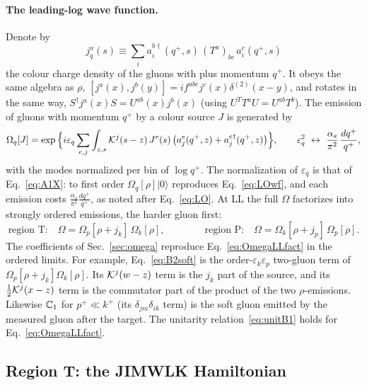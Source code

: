 \paragraph*{The leading-log wave function.} Denote by
\begin{equation}
j^a_q(s)\equiv\sum_i a^{b\dagger}_i(q^+,s)\,(T^a)_{bc}\,a^c_i(q^+,s)
\label{eq:jdef}
\end{equation}
the colour charge density of the gluons with plus momentum $q^+$. It obeys the same algebra as $\rho$, $[j^a(x),j^b(y)]=if^{abc}j^c(x)\delta^{(2)}(x-y)$, and rotates in the same way, $S^\dagger j^a(x)S=U^{ab}(x)j^b(x)$ (using $U^TT^aU=U^{ab}T^b$). The emission of gluons with momentum $q^+$ by a colour source $J$ is generated by
\begin{equation}
\Omega_q[J]=\exp\Big\{i\varepsilon_q\sum_{e,j}\int_{z,s}\KK^j(s-z)\,J^e(s)\,\big(a^e_j(q^+,z)+a^{e\dagger}_j(q^+,z)\big)\Big\},\qquad \varepsilon_q^2\ \leftrightarrow\ \frac{\alpha_s}{\pi^2}\,\frac{dq^+}{q^+},
\label{eq:OmegaLL}
\end{equation}
with the modes normalized per bin of $\log q^+$. The normalization of $\varepsilon_q$ is that of Eq.~\eqref{eq:A1X}: to first order $\Omega_q[\rho]|0\rangle$ reproduces Eq.~\eqref{eq:LOwf}, and each emission costs $\frac{\alpha_s}{\pi^2}\frac{dq^+}{q^+}$, as noted after Eq.~\eqref{eq:LO}. At LL the full $\Omega$ factorizes into strongly ordered emissions, the harder gluon first:
\begin{equation}
\text{region T:}\quad \Omega=\Omega_p[\rho+j_k]\,\Omega_k[\rho],\qquad\qquad \text{region P:}\quad \Omega=\Omega_k[\rho+j_p]\,\Omega_p[\rho].
\label{eq:OmegaLLfact}
\end{equation}
The coefficients of Sec.~\ref{sec:omega} reproduce Eq.~\eqref{eq:OmegaLLfact} in the ordered limits. For example, Eq.~\eqref{eq:B2soft} is the order-$\varepsilon_k\varepsilon_p$ two-gluon term of $\Omega_p[\rho+j_k]\Omega_k[\rho]$. Its $\mathcal{K}^j(w-z)$ term is the $j_k$ part of the source, and its $\frac12\mathcal{K}^j(x-z)$ term is the commutator part of the product of the two $\rho$-emissions. Likewise $\mathbb{C}_1$ for $p^+\ll k^+$ (its $\delta_{jm}\delta_{ik}$ term) is the soft gluon emitted by the measured gluon after the target. The unitarity relation~\eqref{eq:unitB1} holds for Eq.~\eqref{eq:OmegaLLfact}.

\subsection{Region T: the JIMWLK Hamiltonian}\label{sec:T}

